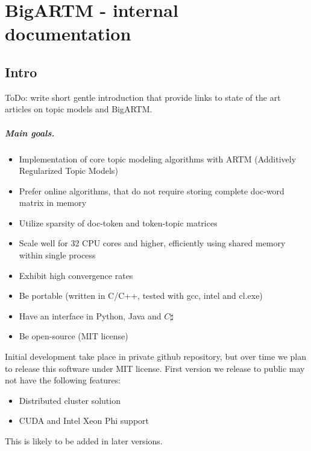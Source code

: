 \documentclass[11pt,a4paper,twoside]{report}
\begin{document}
\tableofcontents

\chapter{BigARTM - internal documentation}

\section{Intro}
ToDo: write short gentle introduction that provide links to state of the art articles on topic models and BigARTM.

\paragraph{Main goals.}
\begin{itemize}
    \item Implementation of core topic modeling algorithms with ARTM (Additively Regularized Topic Models)
    \item Prefer online algorithms, that do not require storing complete doc-word matrix in memory
    \item Utilize sparsity of doc-token and token-topic matrices
    \item Scale well for 32 CPU cores and higher, efficiently using shared memory within single process
    \item Exhibit high convergence rates
    \item Be portable (written in C/C++, tested with gcc, intel and cl.exe)
    \item Have an interface in Python, Java and $C\sharp$
    \item Be open-source (MIT license)
\end{itemize}

Initial development take place in private github repository,
but over time we plan to release this software under MIT license.
First version we release to public may not have the following features:
\begin{itemize}
    \item Distributed cluster solution
    \item CUDA and Intel Xeon Phi support
\end{itemize}
This is likely to be added in later versions.
\end{document}
